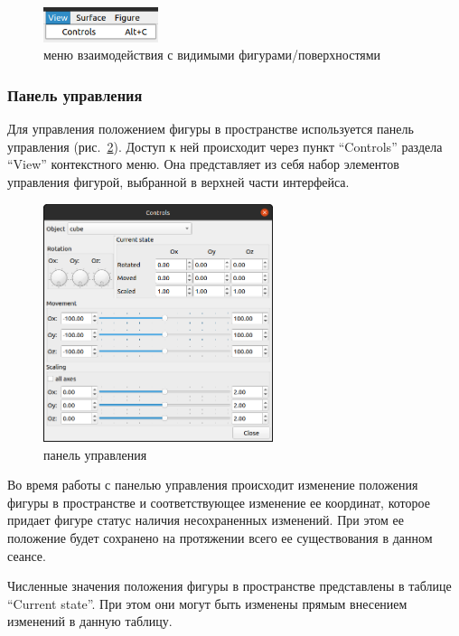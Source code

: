 \documentclass[12pt, a4paper, hidelinks]{article}
\begin{document}
\begin{figure}[htbp!]
	\centering
	\includegraphics[width=0.3\textwidth]{images/viewmenu.png}
	\caption{меню взаимодействия с видимыми фигурами/поверхностями}
	\label{view_menu}
\end{figure}

\subsubsection{Панель управления}
Для управления положением фигуры в пространстве используется панель управления (рис.~\ref{controls}). Доступ к ней происходит через пункт \enquote{Controls} раздела \enquote{View} контекстного меню. Она представляет из себя набор элементов управления фигурой, выбранной в верхней части интерфейса.

\begin{figure}[htbp!]
	\centering
	\includegraphics[width=0.6\textwidth]{images/controls.png}
	\caption{панель управления}
	\label{controls}
\end{figure}

Во время работы с панелью управления происходит изменение положения фигуры в пространстве и соответствующее изменение ее координат, которое придает фигуре статус наличия несохраненных изменений. При этом ее положение будет сохранено на протяжении всего ее существования в данном сеансе.

Численные значения положения фигуры в пространстве представлены в таблице \enquote{Current state}. При этом они могут быть изменены прямым внесением изменений в данную таблицу.
\end{document}
